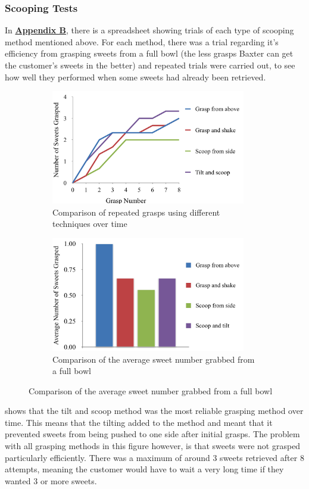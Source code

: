 \subsubsection{Scooping Tests}
\label{sssec:ScoopTest}
In \hyperref[chap:AppendixB]{\textbf{Appendix B}}, there is a spreadsheet showing trials of each type of scooping method mentioned above. For each method, there was a trial regarding it's efficiency from grasping sweets from a full bowl (the less grasps Baxter can get the customer's sweets in the better) and repeated trials were carried out, to see how well they performed when some sweets had already been retrieved.
\begin{figure}[ht!]
    \captionsetup[subfigure]{justification=centering}
    \begin{subfigure}[H]{0.475\textwidth}   
        \centering 
        \caption{Comparison of repeated grasps using different techniques over time}
        \label{fig:TimeGrasp}
        \includegraphics[width=\textwidth, height=5cm]{graspovertime.png}
    \end{subfigure}
    \begin{subfigure}[H]{0.475\textwidth}   
        \centering 
        \caption{Comparison of the average sweet number grabbed from a full bowl}
        \label{fig:AverageGrasp}
        \includegraphics[width=\textwidth, height=5cm]{averagegrasp.png}
    \end{subfigure}
\end{figure}
\textbf{} shows that the tilt and scoop method was the most reliable grasping method over time. This means that the tilting added to the method and meant that it prevented sweets from being pushed to one side after initial grasps. The problem with all grasping methods in this figure however, is that sweets were not grasped particularly efficiently. There was a maximum of around 3 sweets retrieved after 8 attempts, meaning the customer would have to wait a very long time if they wanted 3 or more sweets.

